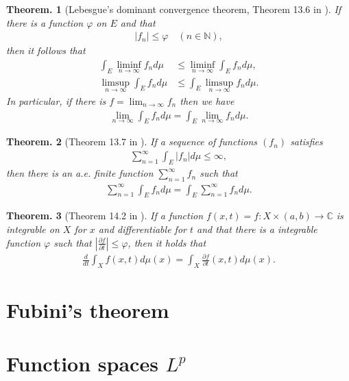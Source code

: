 \documentclass[openany, a4paper, oneside]{jsbook}
\theoremstyle{break}
\newtheorem{thm}{Theorem.}[section]
\theoremstyle{breakdefn}
\newcommand{\abs}[1]{\left|#1\right|}
\newcommand{\rbk}[1]{\left (#1\right)}
\newcommand{\bbC}{\mathbb{C}}
\newcommand{\bbN}{\mathbb{N}}
\newcommand{\dmu}{d \mu}
\begin{document}
\begin{thm}[Lebesgue's dominant convergence theorem, Theorem 13.6 in \cite{SeizoIto1}]
 If there is a function $\varphi$ on $E$ and that
 \begin{align}
  \abs{f_n} \leq \varphi \quad \rbk{n \in \bbN},
 \end{align}
 then it follows that
 \begin{align}
  \int_E \liminf_{n \to \infty} f_n \dmu
  &\leq
  \liminf_{n \to \infty} \int_E f_n \dmu, \\
  \limsup_{n \to \infty} \int_E f_n \dmu
  &\leq
  \int_E \limsup_{n \to \infty} f_n \dmu.
 \end{align}
 In particular, if there is $f = \lim_{n \to \infty} f_n$ then we have
 \begin{align}
  \lim_{n \to \infty} \int_E f_n \dmu
  =
  \int_E \lim_{n \to \infty} f_n \dmu.
 \end{align}
\end{thm}
\begin{thm}[Theorem 13.7 in \cite{SeizoIto1}]
 If a sequence of functions $(f_n)$ satisfies
 \begin{align}
  \sum_{n=1}^{\infty} \int_E \abs{f_n} \dmu
  \leq
  \infty,
 \end{align}
 then there is an a.e. finite function $\sum_{n=1}^{\infty} f_n$ such that
 \begin{align}
  \sum_{n=1}^{\infty} \int_E f_n \dmu
  =
  \int_E \sum_{n=1}^{\infty} f_n \dmu.
 \end{align}
\end{thm}
\begin{thm}[Theorem 14.2 in \cite{SeizoIto1}]
 If a function $f (x,t) = f \colon X \times \rbk{a, b} \to \bbC$ is integrable on $X$ for $x$ and differentiable for $t$
 and that there is a integrable function $\varphi$ such that $\abs{\frac{\partial f}{\partial t}} \leq \varphi$,
 then it holds that
 \begin{align}
  \frac{d}{dt} \int_X f (x, t) \dmu (x)
  =
  \int_X \frac{\partial f}{\partial t} (x, t) \dmu (x).
 \end{align}
\end{thm}
\section{Fubini's theorem}

\section{Function spaces $L^p$}
\end{document}
